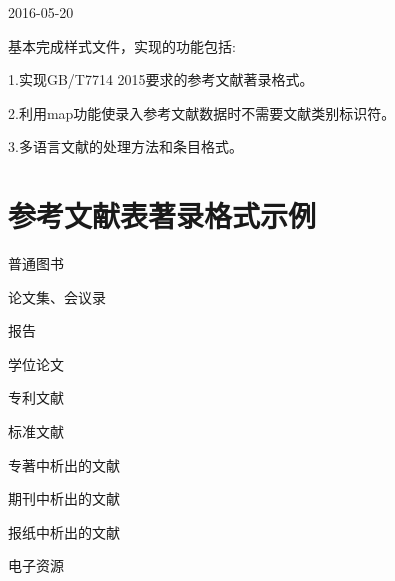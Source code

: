 \documentclass[11pt]{article} %
\begin{document}
2016-05-20

基本完成样式文件，实现的功能包括:

1.实现GB/T7714 2015要求的参考文献著录格式。

2.利用map功能使录入参考文献数据时不需要文献类别标识符。

3.多语言文献的处理方法和条目格式。




\section{参考文献表著录格式示例}\label{sec:eg:gb77142015}
\begin{refsection}
普通图书
\cite{张伯伟2002--}
\cite{2009-155-155}
\cite{胡承正2010-112-112}
\cite{美国妇产科医师学会2010-38-39}
\cite{1962-50-50}
\cite{汪昂1881--}
\cite{蒋有绪1998--}
\cite{中国企业投资协会2013--}
\cite{罗斯基2009--}
\cite{库恩2012--}
\cite{候文顺2010-119-119}
\cite{CRAWFPRD1995--}
\cite{IFLAI1977--}
\cite{OBRIEN1994--}
\cite{Kinchy2012-50-50}
\cite{Praetzellis2011-13-13}

论文集、会议录
\cite{中国职工教育研究会1985--}
\cite{中国社会科学院台湾史研究中心2012--}
\cite{雷光春2012--}
\cite{陈志勇2011--}
\cite{Babu2014--}

报告
\cite{中华人民共和国国务院新闻办公室2013-04-16--}
\cite{汤万金2013-09-30--}
\cite{Calkin2011-8-9}
\cite{DTFHA1990--}
\cite{WHO1970--}

学位论文
\cite{马欢2011-27-27}
\cite{吴云芳2003--}
\cite{CALMS1965--}

专利文献
\cite{张凯军2012-04-05--}
\cite{河北绿洲生态环境科技有限公司2001--}
\cite{KOSEKI2002--}

标准文献
\cite{全国信息文献标准化技术委员会2010-3-3}
\cite{全国广播电视标准化技术委员会2007-1-1}
\cite{国家环境保护局科技标准司1996-2-3}
\cite{standardinfoiso158}

专著中析出的文献
\cite{1988-590-590}
\cite{白书农1998-146-163}
\cite{汪学军2002-22-25}
\cite{国家标准局信息分类编码研究所1988-59-92}
\cite{1977-49-49}
\cite{楼梦麟2011-11-12}
\cite{BUSECK1980-117-211}
\cite{FOURNEY1971-17-38}

期刊中析出的文献
\cite{杨洪升2013-56-75}
\cite{李炳穆2000-5-8}
\cite{于潇2012-1518-1523}
\cite{陈建军2010-93-93}
\cite{DESMARAIS1992-605-609}
\cite{Saito2006-169-176}
\cite{Walls2013-399-418}
\cite{Franz2013-1053-1062}
\cite{Park2010-696-715}

报纸中析出的文献
\cite{丁文祥2000--}
\cite{张田勤2000--}
\cite{傅刚2000--}
\cite{刘裕国2013-01-12--}

电子资源
\cite{萧钰2001--}
\cite{李强2012-05-03--}
\cite{Commonwealth--}
\cite{Dublin2012-06-14--}

\printbibliography[heading=bibliography,title=【参考文献表著录格式示例】]
\end{refsection}
\end{document}
